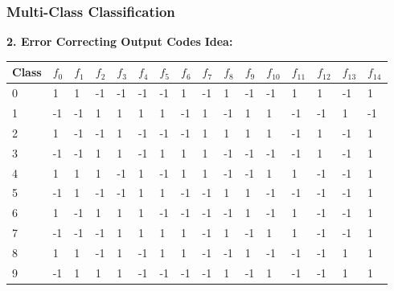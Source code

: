 \documentclass[10pt, compress]{beamer}
\begin{document}
\begin{frame}[fragile]
\frametitle{Multi-Class Classification}

\textbf{\alert{2. Error Correcting Output Codes}} 
\textbf{Idea: }

\begin{table}[ht!]
	\centering
	\label{Codewords}
	\begin{tabular}{|l|l|l|l|l|l|l|l|l|l|l|l|l|l|l|l|}
		\hline
		Class	& $f_0$ & $f_1$ & $f_2$ & $f_3$ & $f_4$ & $f_5$ & $f_6$ & $f_7$ & $f_8$ & $f_9$ & $f_{10}$ & $f_{11}$ & $f_{12}$ & $f_{13}$ & $f_{14}$ \\ \hline \hline
		0	& 1 & 1 & -1 & -1 & -1 & -1 & 1 & -1 & 1 & -1 & -1 & 1 & 1 & -1 & 1 \\ \hline
		1	& -1 & -1 & 1 & 1 & 1 & 1 & -1 & 1 & -1 & 1 & 1 & -1 & -1 & 1 & -1 \\ \hline
		2	& 1 & -1 & -1 & 1 & -1 & -1 & -1 & 1 & 1 & 1 & 1 & -1 & 1 & -1 & 1 \\ \hline
		3	& -1 & -1 & 1 & 1 & -1 & 1 & 1 & 1 & -1 & -1 & -1 & -1 & 1 & -1 & 1 \\ \hline
		4	& 1 & 1 & 1 & -1 & 1 & -1 & 1 & 1 & -1 & -1 & 1 & 1 & -1 & -1 & 1 \\ \hline
		5	& -1 & 1 & -1 & -1 & 1 & 1 & -1 & -1 & 1 & 1 & -1 & -1 & -1 & -1 & 1 \\ \hline
		6	& 1 & -1 & 1 & 1 & 1 & -1 & -1 & -1 & -1 & 1 & -1 & 1 & -1 & -1 & 1 \\ \hline
		7	& -1 & -1 & -1 & 1 & 1 & 1 & 1 & -1 & 1 & -1 & 1 & 1 & -1 & -1 & 1 \\ \hline
		8	& 1 & 1 & -1 & 1 & -1 & 1 & 1 & -1 & -1 & 1 & -1 & -1 & -1 & 1 & 1 \\ \hline
		9	& -1 & 1 & 1 & 1 & -1 & -1 & -1 & -1 & 1 & -1 & 1 & -1 & -1 & 1 & 1 \\ \hline
	\end{tabular}
\end{table}  

\end{frame}
\end{document}
